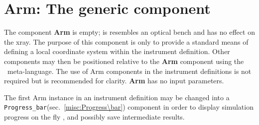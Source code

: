 \section{Arm: The generic component}
\label{explain:arm}

The component {\bf Arm} is empty; is resembles an optical bench
and has no effect on the xray.
The purpose of this component is only to provide a standard
means of defining a local coordinate system within the instrument definition.
Other components may then be
positioned relative to the {\bf Arm} component
using the \MCX\ meta-language.
The use of {\rm Arm} components in the instrument definitions
is not required but is recommended for clarity.
{\bf Arm} has no input parameters.

The first Arm instance in an instrument definition may be changed into a \verb+Progress_bar+(sec.~\ref{misc:Progress\bar}) component in order to display simulation progress on the fly , and possibly save intermediate results.
